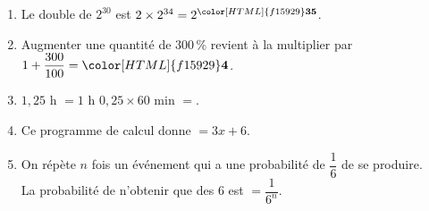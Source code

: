\documentclass[a4paper,11pt,landscape,exos]{nsi} %
\begin{document}
\begin{multicols}{2}
\begin{enumerate}[itemsep=1em]
         
    \item Le double de $2^{30}$ est $2\times 2^{34}=2^{{\color[HTML]{f15929}\boldsymbol{35}}}$.
    \vfill\null
    \columnbreak
    \item Augmenter une quantité de $300\,\%$ revient à la multiplier par $1+\dfrac{300}{100}={\color[HTML]{f15929}\boldsymbol{4}}$.

    \item $1,25$ h $=1$ h $0,25\times 60$ min $=${\color[HTML]{f15929}{$1$ h $15$ min}}.
    \item Ce programme de calcul donne {\color[HTML]{f15929}{$3(x+2)$}} $=3x+6$.
    \item On répète $n$ fois un événement qui a une probabilité de $\dfrac{1}{6}$ de se produire.\\
          La probabilité de n'obtenir que des 6 est {} $=\dfrac{1}{6^n}$.
       
\end{enumerate}
\end{multicols}
\end{document}
